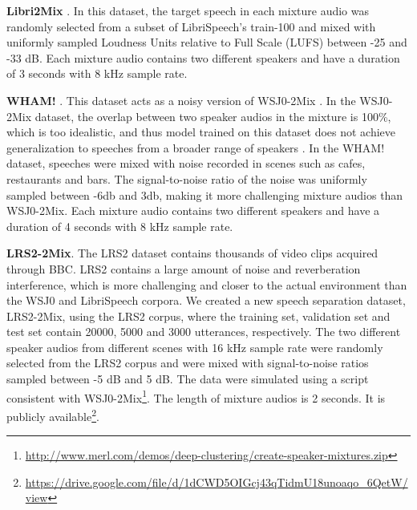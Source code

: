 \documentclass{article} \usepackage{iclr2023_conference,times}
\begin{document}
\textbf{Libri2Mix} \citep{cosentino2020librimix}. In this dataset, the target speech in each mixture audio was randomly selected from a subset of LibriSpeech's train-100 \citep{panayotov2015librispeech} and mixed with uniformly sampled Loudness Units relative to Full Scale (LUFS) \citep{series2011algorithms} between -25 and -33 dB. Each mixture audio contains two different speakers and have a duration of 3 seconds with 8 kHz sample rate.

\textbf{WHAM!} \citep{Wichern2019}. This dataset acts as a noisy version of WSJ0-2Mix \citep{hershey2016deep}. In the WSJ0-2Mix dataset, the overlap between two speaker audios in the mixture is 100\%, which is too idealistic, and thus model trained on this dataset does not achieve generalization to speeches from a broader range of speakers \citep{cosentino2020librimix}. In the WHAM! dataset, speeches were mixed with noise recorded in scenes such as cafes, restaurants and bars. The signal-to-noise ratio of the noise was uniformly sampled between -6db and 3db, making it more challenging mixture audios than WSJ0-2Mix. Each mixture audio contains two different speakers and have a duration of 4 seconds with 8 kHz sample rate.

\textbf{LRS2-2Mix}. The LRS2 dataset \citep{afouras2018deep} contains thousands of video clips acquired through BBC. LRS2 contains a large amount of noise and reverberation interference, which is more challenging and closer to the actual environment than the WSJ0 \citep{garofolo1993csr} and LibriSpeech \citep{panayotov2015librispeech} corpora. We created a new speech separation dataset, LRS2-2Mix, using the LRS2 corpus, where the training set, validation set and test set contain 20000, 5000 and 3000 utterances, respectively. The two different speaker audios from different scenes with 16 kHz sample rate were randomly selected from the LRS2 corpus and were mixed with signal-to-noise ratios sampled between -5 dB and 5 dB. The data were simulated using a script consistent with WSJ0-2Mix\footnote{\url{http://www.merl.com/demos/deep-clustering/create-speaker-mixtures.zip}}. The length of mixture audios is 2 seconds. It is publicly available\footnote{\url{https://drive.google.com/file/d/1dCWD5OIGcj43qTidmU18unoaqo_6QetW/view}}.
\end{document}
